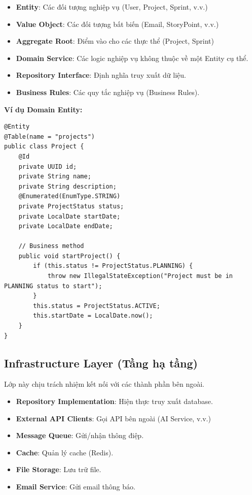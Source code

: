 \documentclass[12pt,a4paper]{report}
\begin{document}
\begin{itemize}
\item \textbf{Entity}: Các đối tượng nghiệp vụ (User, Project, Sprint, v.v.)
\item \textbf{Value Object}: Các đối tượng bất biến (Email, StoryPoint, v.v.)
\item \textbf{Aggregate Root}: Điểm vào cho các thực thể (Project, Sprint)
\item \textbf{Domain Service}: Các logic nghiệp vụ không thuộc về một Entity cụ thể.
\item \textbf{Repository Interface}: Định nghĩa truy xuất dữ liệu.
\item \textbf{Business Rules}: Các quy tắc nghiệp vụ (Business Rules).
\end{itemize}

\textbf{Ví dụ Domain Entity:}

\begin{verbatim}
@Entity
@Table(name = "projects")
public class Project {
    @Id
    private UUID id;
    private String name;
    private String description;
    @Enumerated(EnumType.STRING)
    private ProjectStatus status;
    private LocalDate startDate;
    private LocalDate endDate;

    // Business method
    public void startProject() {
        if (this.status != ProjectStatus.PLANNING) {
            throw new IllegalStateException("Project must be in PLANNING status to start");
        }
        this.status = ProjectStatus.ACTIVE;
        this.startDate = LocalDate.now();
    }
}
\end{verbatim}

\subsection{Infrastructure Layer (Tầng hạ tầng)}

Lớp này chịu trách nhiệm kết nối với các thành phần bên ngoài.

\begin{itemize}
\item \textbf{Repository Implementation}: Hiện thực truy xuất database.
\item \textbf{External API Clients}: Gọi API bên ngoài (AI Service, v.v.)
\item \textbf{Message Queue}: Gửi/nhận thông điệp.
\item \textbf{Cache}: Quản lý cache (Redis).
\item \textbf{File Storage}: Lưu trữ file.
\item \textbf{Email Service}: Gửi email thông báo.
\end{itemize}
\end{document}
